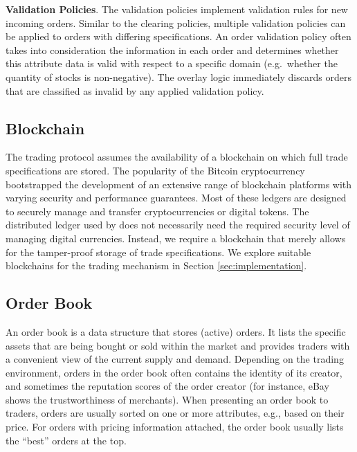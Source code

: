 \textbf{Validation Policies}.
The validation policies implement validation rules for new incoming orders.
Similar to the clearing policies, multiple validation policies can be applied to orders with differing specifications.
An order validation policy often takes into consideration the information in each order and determines whether this attribute data is valid with respect to a specific domain
(e.g.\ whether the quantity of stocks is non-negative).
The overlay logic immediately discards orders that are classified as invalid by any applied validation policy.

\subsection{\ModelName{} Blockchain}
The \ModelName{} trading protocol assumes the availability of a blockchain on which full trade specifications are stored.
The popularity of the Bitcoin cryptocurrency bootstrapped the development of an extensive range of blockchain platforms with varying security and performance guarantees.
Most of these ledgers are designed to securely manage and transfer cryptocurrencies or digital tokens.
The distributed ledger used by \ModelName{} does not necessarily need the required security level of managing digital currencies.
Instead, we require a blockchain that merely allows for the tamper-proof storage of trade specifications.
We explore suitable blockchains for the \ModelName{} trading mechanism in Section \ref{sec:implementation}.

\subsection{Order Book}
\label{subsec:order_book}
An order book is a data structure that stores (active) orders.
It lists the specific assets that are being bought or sold within the market and provides traders with a convenient view of the current supply and demand.
Depending on the trading environment, orders in the order book often contains the identity of its creator, and sometimes the reputation scores of the order creator (for instance, eBay shows the trustworthiness of merchants).
When presenting an order book to traders, orders are usually sorted on one or more attributes, e.g., based on their price.
For orders with pricing information attached, the order book usually lists the \enquote{best} orders at the top.

